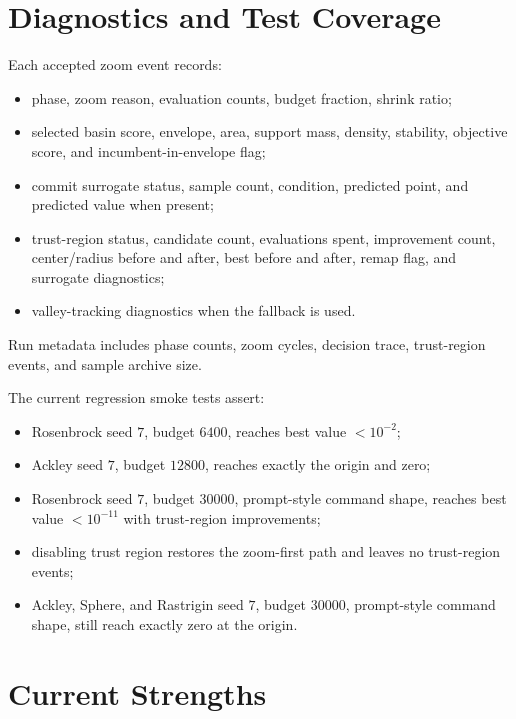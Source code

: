 \documentclass[11pt]{article}
\begin{document}
\section{Diagnostics and Test Coverage}

Each accepted zoom event records:
\begin{itemize}[nosep]
\item phase, zoom reason, evaluation counts, budget fraction, shrink ratio;
\item selected basin score, envelope, area, support mass, density, stability,
objective score, and incumbent-in-envelope flag;
\item commit surrogate status, sample count, condition, predicted point, and
predicted value when present;
\item trust-region status, candidate count, evaluations spent, improvement
count, center/radius before and after, best before and after, remap flag, and
surrogate diagnostics;
\item valley-tracking diagnostics when the fallback is used.
\end{itemize}
Run metadata includes phase counts, zoom cycles, decision trace, trust-region
events, and sample archive size.

The current regression smoke tests assert:
\begin{itemize}[nosep]
\item Rosenbrock seed $7$, budget $6400$, reaches best value $<10^{-2}$;
\item Ackley seed $7$, budget $12800$, reaches exactly the origin and zero;
\item Rosenbrock seed $7$, budget $30000$, prompt-style command shape,
reaches best value $<10^{-11}$ with trust-region improvements;
\item disabling trust region restores the zoom-first path and leaves no
trust-region events;
\item Ackley, Sphere, and Rastrigin seed $7$, budget $30000$, prompt-style
command shape, still reach exactly zero at the origin.
\end{itemize}

\section{Current Strengths}
\end{document}
